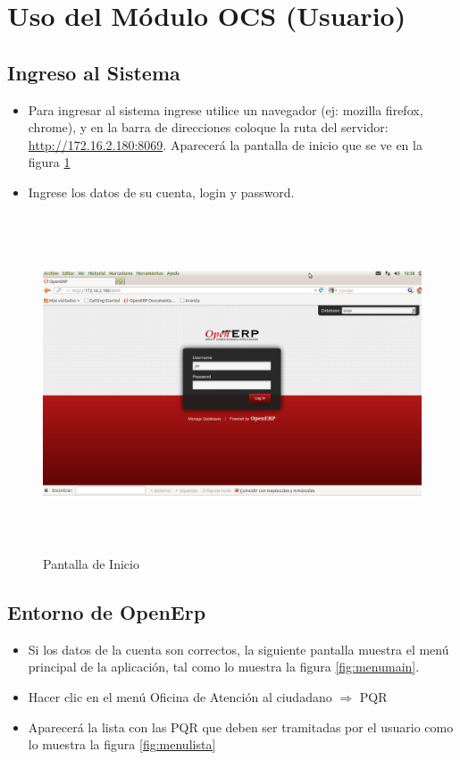%
%

\section{Uso del Módulo OCS (Usuario)}
\subsection{Ingreso al Sistema}
\begin{itemize}
 \item Para ingresar al sistema ingrese utilice un navegador (ej: mozilla firefox, chrome), y en la barra de direcciones coloque la ruta del servidor: \underline{http://172.16.2.180:8069}. Aparecerá la pantalla
 de inicio que se ve en la figura \ref{fig:login}
 \item Ingrese los datos de su cuenta, login y password.
\end{itemize}

\begin{figure}
 \centering
 \includegraphics[width=15cm,height=10cm]{./Imagenes/Login.png}
 \caption{Pantalla de Inicio}
 \label{fig:login}
\end{figure}

\subsection{Entorno de OpenErp}

\begin{itemize}
 \item Si los datos de la cuenta son correctos, la siguiente pantalla muestra el menú principal de la aplicación, tal como lo muestra la figura \ref{fig:menumain}.
 \item Hacer clic en el menú Oficina de Atención al ciudadano $\Rightarrow$ PQR
 \item Aparecerá la lista con las PQR que deben ser tramitadas por el usuario como lo muestra la figura \ref{fig:menulista}
\end{itemize}

